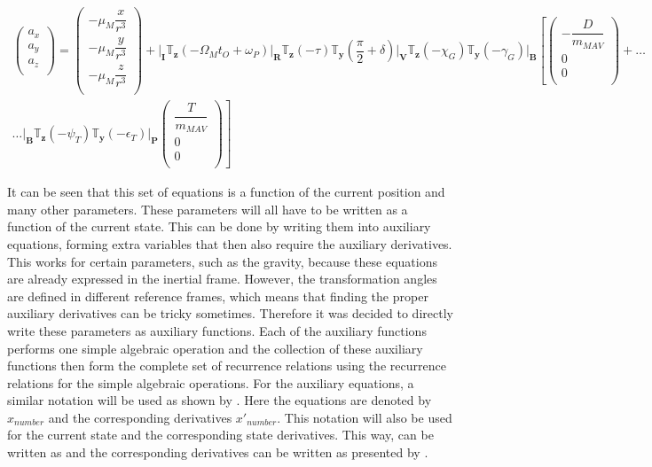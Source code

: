 \begin{multline} \label{eq:acc}
\begin{pmatrix}
a_{x}\\
a_{y}\\
a_{z}\\
\end{pmatrix}
=
\begin{pmatrix}
-\mu_{M}\dfrac{x}{r^{3}}\\
-\mu_{M}\dfrac{y}{r^{3}}\\
-\mu_{M}\dfrac{z}{r^{3}}\\
\end{pmatrix}+
\Bigg|_{\mathbf{I}}\mathbb{T}_{\mathbf{z}}\left(-\Omega_{M}t_{O}+\omega_{P}\right)\Bigg|_{\mathbf{R}}\mathbb{T}_{\mathbf{z}}\left(-\tau\right)\mathbb{T}_{\mathbf{y}}\left(\dfrac{\pi}{2}+\delta\right)\Bigg|_{\mathbf{V}}\mathbb{T}_{\mathbf{z}}\left(-\chi_{G}\right)\mathbb{T}_{\mathbf{y}}\left(-\gamma_{G}\right)\Bigg|_{\mathbf{B}}\left[
\begin{pmatrix}
-\dfrac{D}{m_{MAV}}\\
0\\
0\\
\end{pmatrix}
+  \right. \dots \\
\dotsc
 \left.
\Bigg|_{\mathbf{B}}\mathbb{T}_{\mathbf{z}}\left(-\psi_{T}\right)\mathbb{T}_{\mathbf{y}}\left(-\epsilon_{T}\right)\Bigg|_{\mathbf{P}}
\begin{pmatrix}
\dfrac{T}{m_{MAV}}\\
0\\
0\\
\end{pmatrix}
\right]
\end{multline}

It can be seen that this set of equations is a function of the current position and many other parameters. These parameters will all have to be written as a function of the current state. This can be done by writing them into auxiliary equations, forming extra variables that then also require the auxiliary derivatives. This works for certain parameters, such as the gravity, because these equations are already expressed in the inertial frame. However, the transformation angles are defined in different reference frames, which means that finding the proper auxiliary derivatives can be tricky sometimes. Therefore it was decided to directly write these parameters as auxiliary functions. Each of the auxiliary functions performs one simple algebraic operation and the collection of these auxiliary functions then form the complete set of recurrence relations using the recurrence relations for the simple algebraic operations. For the auxiliary equations, a similar notation will be used as shown by \cite{scott2008high}. Here the equations are denoted by $x_{number}$ and the corresponding derivatives $x'_{number}$. This notation will also be used for the current state and the corresponding state derivatives. This way,  can be written as  and the corresponding derivatives can be written as presented by .

